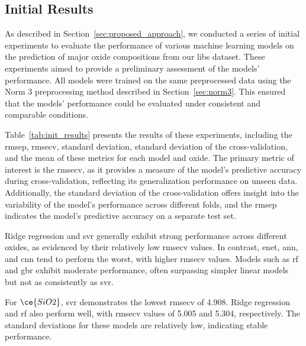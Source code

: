 \subsection{Initial Results}



As described in Section~\ref{sec:proposed_approach}, we conducted a series of initial experiments to evaluate the performance of various machine learning models on the prediction of major oxide compositions from our \gls{libs} dataset.
These experiments aimed to provide a preliminary assessment of the models' performance.
All models were trained on the same preprocessed data using the Norm 3 preprocessing method described in Section~\ref{sec:norm3}.
This ensured that the models' performance could be evaluated under consistent and comparable conditions.

Table~\ref{tab:init_results} presents the results of these experiments, including the \gls{rmsep}, \gls{rmsecv}, standard deviation, standard deviation of the cross-validation, and the mean of these metrics for each model and oxide.
The primary metric of interest is the \gls{rmsecv}, as it provides a measure of the model's predictive accuracy during cross-validation, reflecting its generalization performance on unseen data.
Additionally, the standard deviation of the cross-validation offers insight into the variability of the model's performance across different folds, and the \gls{rmsep} indicates the model's predictive accuracy on a separate test set.

Ridge regression and \gls{svr} generally exhibit strong performance across different oxides, as evidenced by their relatively low \gls{rmsecv} values.
In contrast, \gls{enet}, \gls{ann}, and \gls{cnn} tend to perform the worst, with higher \gls{rmsecv} values.
Models such as \gls{rf} and \gls{gbr} exhibit moderate performance, often surpassing simpler linear models but not as consistently as \gls{svr}.

For $\ce{SiO2}$, \gls{svr} demonstrates the lowest \gls{rmsecv} of 4.908.
Ridge regression and \gls{rf} also perform well, with \gls{rmsecv} values of 5.005 and 5.304, respectively.
The standard deviations for these models are relatively low, indicating stable performance.

